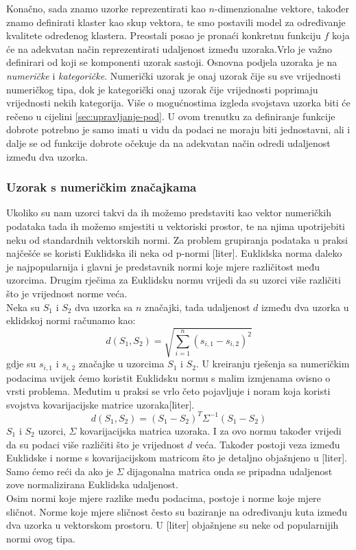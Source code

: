 \documentclass[a4paper,twoside,12pt]{memoir} %
\begin{document}
Konačno, sada znamo uzorke reprezentirati kao $n$-dimenzionalne vektore, također znamo definirati klaster kao skup vektora, te smo postavili model za određivanje kvalitete određenog klastera. Preostali posao je pronaći konkretnu funkciju $f$ koja će na adekvatan način reprezentirati udaljenost između uzoraka.Vrlo je važno definirari od koji se komponenti uzorak sastoji. Osnovna podjela uzoraka je na \textit{numeričke} i \textit{kategoričke}. Numerički uzorak je onaj uzorak čije su sve vrijednosti numeričkog tipa, dok je kategorički onaj uzorak čije vrijednosti poprimaju vrijednosti nekih kategorija. Više o mogućnostima izgleda svojstava uzorka biti će rečeno u cijelini \ref{sec:upravljanje-pod}. U ovom trenutku za definiranje funkcije dobrote potrebno je samo imati u vidu da podaci ne moraju biti jednostavni, ali i dalje se od funkcije dobrote očekuje da na adekvatan način odredi udaljenost između dva uzorka.
\subsubsection{Uzorak s numeričkim značajkama}
Ukoliko su nam uzorci takvi da ih možemo predstaviti kao vektor numeričkih podataka tada ih možemo smjestiti u vektoriski prostor, te na njima upotrijebiti neku od standardnih vektorskih normi. Za problem grupiranja podataka u praksi najčešće se koristi Euklidska ili neka od p-normi [liter]. 
Euklidska norma daleko je najpopularnija i glavni je predstavnik normi koje mjere različitost među uzorcima. Drugim rječima za Euklidsku normu vrijedi da su uzorci više različiti što je vrijednost norme veća. \\
Neka su $S_1$ i $S_2$ dva uzorka sa $n$ značajki, tada udaljenost $d$ između dva uzorka u eklidskoj normi računamo kao:
\begin{equation}
\label{equ:metrika-num}
d(S_1,S_2) = \sqrt{\sum_{i=1}^{n}(s_{i,1} -s_{i,2})^2}
\end{equation}
gdje su $s_{i,1}$ i $s_{i,2}$ značajke u uzorcima $S_1$ i $S_2$. U kreiranju rješenja sa numeričkim podacima uvijek ćemo koristit Euklidsku normu s malim izmjenama ovisno o vrsti problema. Međutim u praksi se vrlo četo pojavljuje i noram koja koristi svojstva kovarijacijske matrice uzoraka[liter]. 
\begin{equation}
d(S_1,S_2) = (S_1-S_2)^T\Sigma^{-1}(S_1-S_2)
\end{equation}
$S_1$ i $S_2$ uzorci, $\Sigma $ kovarijacijska matrica uzoraka. I za ovo normu također vrijedi da su podaci više različiti što je vrijednost $d$ veća. Također postoji veza između Euklidske i norme s kovarijacijskom matricom što je detaljno objašnjeno u [liter]. Samo ćemo reći da ako je $\Sigma$ dijagonalna matrica onda se pripadna udaljenost zove normalizirana Euklidska udaljenost.\\
Osim normi koje mjere razlike među podacima, postoje i norme koje mjere sličnot. Norme koje mjere sličnost često su baziranje na određivanju kuta između dva uzorka u vektorskom prostoru. U [liter] objašnjene su neke od popularnijih normi ovog tipa.
\end{document}
